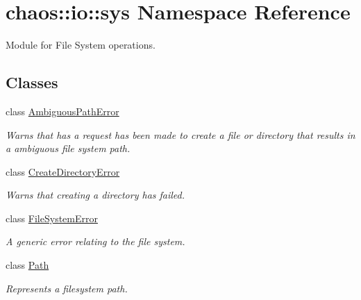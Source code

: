 \hypertarget{namespacechaos_1_1io_1_1sys}{}\section{chaos\+:\+:io\+:\+:sys Namespace Reference}
\label{namespacechaos_1_1io_1_1sys}


Module for File System operations.  


\subsection*{Classes}
\begin{DoxyCompactItemize}
\item 
class \hyperlink{classchaos_1_1io_1_1sys_1_1_ambiguous_path_error}{Ambiguous\+Path\+Error}
\begin{DoxyCompactList}\small\item\em Warns that has a request has been made to create a file or directory that results in a ambiguous file system path. \end{DoxyCompactList}\item 
class \hyperlink{classchaos_1_1io_1_1sys_1_1_create_directory_error}{Create\+Directory\+Error}
\begin{DoxyCompactList}\small\item\em Warns that creating a directory has failed. \end{DoxyCompactList}\item 
class \hyperlink{classchaos_1_1io_1_1sys_1_1_file_system_error}{File\+System\+Error}
\begin{DoxyCompactList}\small\item\em A generic error relating to the file system. \end{DoxyCompactList}\item 
class \hyperlink{classchaos_1_1io_1_1sys_1_1_path}{Path}
\begin{DoxyCompactList}\small\item\em Represents a filesystem path. \end{DoxyCompactList}\end{DoxyCompactItemize}

